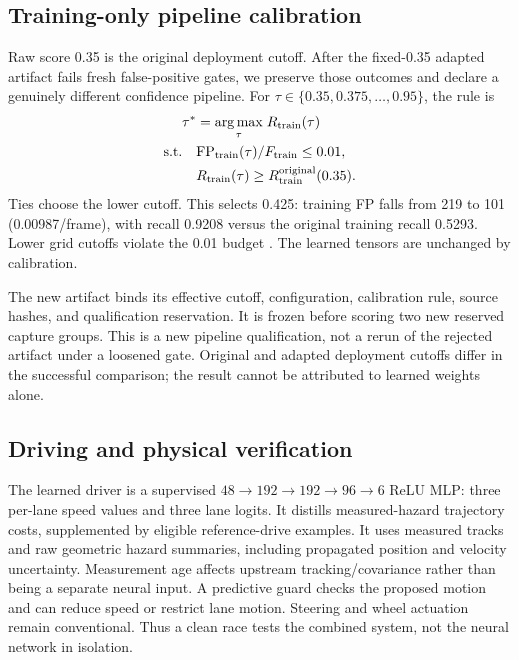 \documentclass[conference]{IEEEtran}
\newcommand{\FP}{\mathrm{FP}}
\begin{document}
\subsection{Training-only pipeline calibration}
Raw score 0.35 is the original deployment cutoff. After the fixed-0.35 adapted artifact fails fresh false-positive gates, we preserve those outcomes and declare a genuinely different confidence pipeline. For $\tau\in\{0.35,0.375,\ldots,0.95\}$, the rule is
\begin{equation}
\begin{aligned}
\tau^*&=\underset{\tau}{\arg\max}\;R_{\rm train}(\tau)\\
\text{s.t.}\quad&\FP_{\rm train}(\tau)/F_{\rm train}\leq0.01,\\
&R_{\rm train}(\tau)\geq R^{\rm original}_{\rm train}(0.35).
\end{aligned}
\end{equation}
Ties choose the lower cutoff. This selects 0.425: training FP falls from 219 to 101 (0.00987/frame), with recall 0.9208 versus the original training recall 0.5293. Lower grid cutoffs violate the 0.01 budget . The learned tensors are unchanged by calibration.

The new artifact binds its effective cutoff, configuration, calibration rule, source hashes, and qualification reservation. It is frozen before scoring two new reserved capture groups. This is a new pipeline qualification, not a rerun of the rejected artifact under a loosened gate. Original and adapted deployment cutoffs differ in the successful comparison; the result cannot be attributed to learned weights alone.




\subsection{Driving and physical verification}
The learned driver is a supervised $48\!\rightarrow\!192\!\rightarrow\!192\!\rightarrow\!96\!\rightarrow\!6$ ReLU MLP: three per-lane speed values and three lane logits. It distills measured-hazard trajectory costs, supplemented by eligible reference-drive examples. It uses measured tracks and raw geometric hazard summaries, including propagated position and velocity uncertainty. Measurement age affects upstream tracking/covariance rather than being a separate neural input. A predictive guard checks the proposed motion and can reduce speed or restrict lane motion. Steering and wheel actuation remain conventional. Thus a clean race tests the combined system, not the neural network in isolation.
\end{document}
